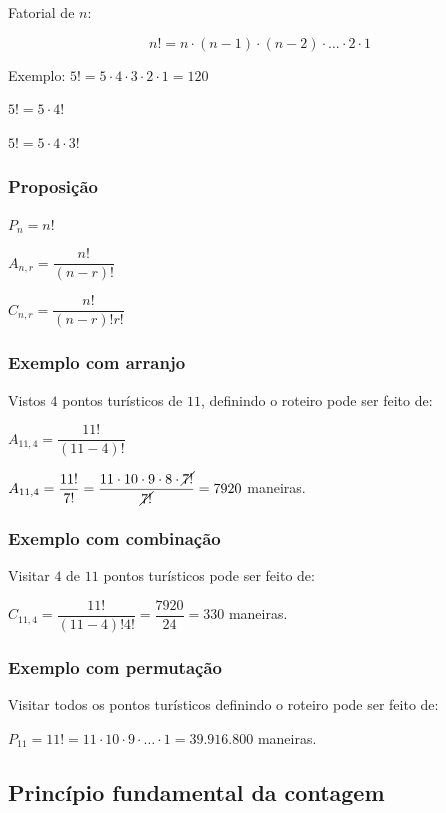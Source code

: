 \documentclass[a4paper]{article}
\begin{document}
	Fatorial de $n$:
	
	\begin{equation*}
		n! = n \cdot (n-1) \cdot (n-2) \cdot \dots \cdot 2 \cdot 1
	\end{equation*}
	
	Exemplo: $5! = 5 \cdot 4 \cdot 3 \cdot 2 \cdot 1 = 120$
	
	$5! = 5 \cdot 4!$
	
	$5! = 5 \cdot 4 \cdot 3!$
	
	\subsubsection{Proposição}
	
	$P_n = n!$
	
	$A_{n,r} = \dfrac{n!}{(n-r)!}$
	
	$C_{n,r} = \dfrac{n!}{(n-r)! r!}$
	
	\subsubsection{Exemplo com arranjo}
	
	Vistos $4$ pontos turísticos de $11$, definindo o roteiro pode ser feito de:
	
	$A_{11,4} = \dfrac{11!}{(11-4)!}$
	
	$A_{11,4} = \dfrac{11!}{7!} = \dfrac{11 \cdot 10 \cdot 9 \cdot 8 \cdot \cancel{7!}}{\cancel{7!}} = 7920$ maneiras.
	
	\subsubsection{Exemplo com combinação}
	
	Visitar $4$ de $11$ pontos turísticos pode ser feito de:
	
	$C_{11,4} = \dfrac{11!}{(11-4)! 4!} = \dfrac{7920}{24} = 330$ maneiras.
	
	\subsubsection{Exemplo com permutação}
	
	Visitar todos os pontos turísticos definindo o roteiro pode ser feito de:
	
	$P_{11} = 11! = 11 \cdot 10 \cdot 9 \cdot \dots \cdot 1 = 39.916.800$ maneiras.
	
	\subsection{Princípio fundamental da contagem}
	
\end{document}
